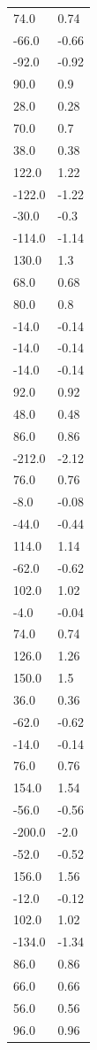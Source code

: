 \begin{longtable}{ll}
74.0 & 0.74 \\
-66.0 & -0.66 \\
-92.0 & -0.92 \\
90.0 & 0.9 \\
28.0 & 0.28 \\
70.0 & 0.7 \\
38.0 & 0.38 \\
122.0 & 1.22 \\
-122.0 & -1.22 \\
-30.0 & -0.3 \\
-114.0 & -1.14 \\
130.0 & 1.3 \\
68.0 & 0.68 \\
80.0 & 0.8 \\
-14.0 & -0.14 \\
-14.0 & -0.14 \\
-14.0 & -0.14 \\
92.0 & 0.92 \\
48.0 & 0.48 \\
86.0 & 0.86 \\
-212.0 & -2.12 \\
76.0 & 0.76 \\
-8.0 & -0.08 \\
-44.0 & -0.44 \\
114.0 & 1.14 \\
-62.0 & -0.62 \\
102.0 & 1.02 \\
-4.0 & -0.04 \\
74.0 & 0.74 \\
126.0 & 1.26 \\
150.0 & 1.5 \\
36.0 & 0.36 \\
-62.0 & -0.62 \\
-14.0 & -0.14 \\
76.0 & 0.76 \\
154.0 & 1.54 \\
-56.0 & -0.56 \\
-200.0 & -2.0 \\
-52.0 & -0.52 \\
156.0 & 1.56 \\
-12.0 & -0.12 \\
102.0 & 1.02 \\
-134.0 & -1.34 \\
86.0 & 0.86 \\
66.0 & 0.66 \\
56.0 & 0.56 \\
96.0 & 0.96 \\

\end{longtable}
